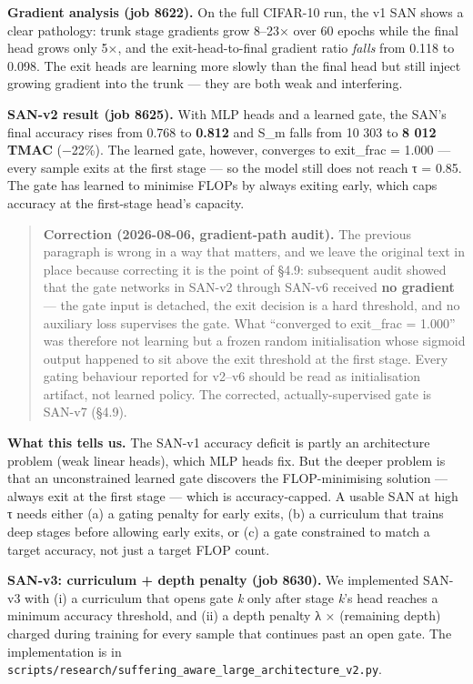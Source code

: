 \documentclass[
]{article}
\begin{document}
\textbf{Gradient analysis (job 8622).} On the full CIFAR-10 run, the v1
SAN shows a clear pathology: trunk stage gradients grow 8--23× over 60
epochs while the final head grows only 5×, and the exit-head-to-final
gradient ratio \emph{falls} from 0.118 to 0.098. The exit heads are
learning more slowly than the final head but still inject growing
gradient into the trunk --- they are both weak and interfering.

\textbf{SAN-v2 result (job 8625).} With MLP heads and a learned gate,
the SAN's final accuracy rises from 0.768 to \textbf{0.812} and S\_m
falls from 10 303 to \textbf{8 012 TMAC} (−22\%). The learned gate,
however, converges to exit\_frac = 1.000 --- every sample exits at the
first stage --- so the model still does not reach τ = 0.85. The gate has
learned to minimise FLOPs by always exiting early, which caps accuracy
at the first-stage head's capacity.

\begin{quote}
\textbf{Correction (2026-08-06, gradient-path audit).} The previous
paragraph is wrong in a way that matters, and we leave the original text
in place because correcting it is the point of §4.9: subsequent audit
showed that the gate networks in SAN-v2 through SAN-v6 received
\textbf{no gradient} --- the gate input is detached, the exit decision
is a hard threshold, and no auxiliary loss supervises the gate. What
``converged to exit\_frac = 1.000'' was therefore not learning but a
frozen random initialisation whose sigmoid output happened to sit above
the exit threshold at the first stage. Every gating behaviour reported
for v2--v6 should be read as initialisation artifact, not learned
policy. The corrected, actually-supervised gate is SAN-v7 (§4.9).
\end{quote}

\textbf{What this tells us.} The SAN-v1 accuracy deficit is partly an
architecture problem (weak linear heads), which MLP heads fix. But the
deeper problem is that an unconstrained learned gate discovers the
FLOP-minimising solution --- always exit at the first stage --- which is
accuracy-capped. A usable SAN at high τ needs either (a) a gating
penalty for early exits, (b) a curriculum that trains deep stages before
allowing early exits, or (c) a gate constrained to match a target
accuracy, not just a target FLOP count.

\textbf{SAN-v3: curriculum + depth penalty (job 8630).} We implemented
SAN-v3 with (i) a curriculum that opens gate \emph{k} only after stage
\emph{k}'s head reaches a minimum accuracy threshold, and (ii) a depth
penalty λ × (remaining depth) charged during training for every sample
that continues past an open gate. The implementation is in
\texttt{scripts/research/suffering\_aware\_large\_architecture\_v2.py}.
\end{document}
